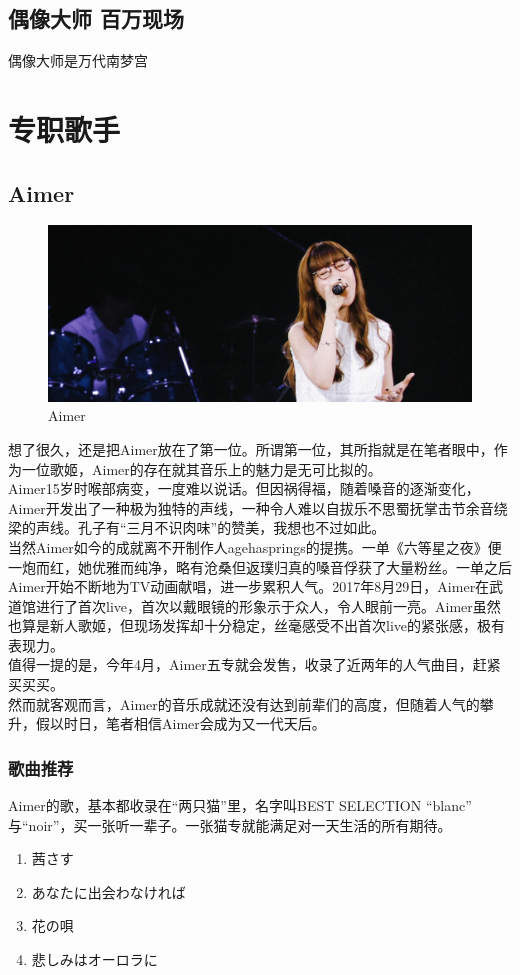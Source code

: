 \documentclass{ctexart}
\begin{document}
\subsection{偶像大师 百万现场}
偶像大师是万代南梦宫

\section{专职歌手}
\subsection{Aimer}

\begin{figure}[h]
\centering
 \includegraphics[width=1.0\textwidth]{Aimer.jpg}
 \caption{Aimer}
\end{figure}

想了很久，还是把Aimer放在了第一位。所谓第一位，其所指就是在笔者眼中，作为一位歌姬，Aimer的存在就其音乐上的魅力是无可比拟的。\\
Aimer15岁时喉部病变，一度难以说话。但因祸得福，随着嗓音的逐渐变化，Aimer开发出了一种极为独特的声线，一种令人难以自拔乐不思蜀抚掌击节余音绕梁的声线。孔子有“三月不识肉味”的赞美，我想也不过如此。\\
当然Aimer如今的成就离不开制作人agehasprings的提携。一单《六等星之夜》便一炮而红，她优雅而纯净，略有沧桑但返璞归真的嗓音俘获了大量粉丝。一单之后Aimer开始不断地为TV动画献唱，进一步累积人气。2017年8月29日，Aimer在武道馆进行了首次live，首次以戴眼镜的形象示于众人，令人眼前一亮。Aimer虽然也算是新人歌姬，但现场发挥却十分稳定，丝毫感受不出首次live的紧张感，极有表现力。\\
值得一提的是，今年4月，Aimer五专就会发售，收录了近两年的人气曲目，赶紧买买买。\\
然而就客观而言，Aimer的音乐成就还没有达到前辈们的高度，但随着人气的攀升，假以时日，笔者相信Aimer会成为又一代天后。\\

\subsubsection*{歌曲推荐}
Aimer的歌，基本都收录在“两只猫”里，名字叫BEST SELECTION “blanc” 与“noir”，买一张听一辈子。一张猫专就能满足对一天生活的所有期待。
\begin{enumerate}
\item 茜さす
\item あなたに出会わなければ
\item 花の唄
\item 悲しみはオーロラに
\end{enumerate}
\end{document}

